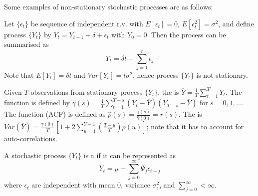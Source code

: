Some examples of non-stationary stochastic processes are as follows:

\begin{example}  Let $\{\epsilon_t \}$ be sequence of independent r.v. with  $E[\epsilon_t] = 0$, $E[\epsilon_t^2] = \sigma^2$, and define process $\{Y_t\}$ by $Y_t = Y_{t-1} + \delta + \epsilon_t$ with $Y_0 = 0$. Then the process can be summarised as
\begin{equation}
Y_t = \delta t + \sum\limits_{j=1}^t \epsilon_j \nonumber
\end{equation}
Note that $E[Y_t] = \delta t$ and $Var[Y_t] = t \sigma^2$, hence process $\{Y_t\}$ is not stationary.
\end{example}

Given $T$ observations from stationary process $\{Y_t\}$, the  is $\overline{Y} = \frac{1}{T} \sum\limits_{t=1}^T Y_t$. The  function is defined by $\hat{\gamma}(s) = \frac{1}{T} \sum\limits_{t=1}^{T-s} (Y_t - \overline{Y})(Y_{T-s} - \overline{Y})$ for $s=0, 1, \ldots$. The  function (ACF) is defined as $\hat{\rho}(s) = \frac{\hat{\gamma}(s)}{\hat{\gamma}(0)} = r(s)$. The  is $Var(\overline{Y}) = \frac{\gamma(0)}{T}\left[1 + 2 \sum\limits_{u=1}^{Y-1} \left(\frac{T-u}{T} \right) \rho(u) \right]$; note that it has to account for auto-correlations.

\begin{definition} A stochastic process $\{Y_t\}$ is a  if it can be represented as
\begin{equation}
Y_t = \mu + \sum\limits_{j=0}^{\infty} \Psi_j \epsilon_{t-j} \nonumber
\end{equation}
where $\epsilon_t$ are independent with mean $0$, variance $\sigma_{\epsilon}^2$, and $\sum\limits_{j=0}^{\infty} < \infty$.
\end{definition}
